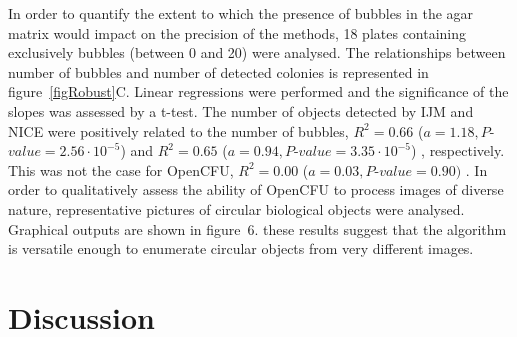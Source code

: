 \documentclass[10pt]{article}
\newcommand{\IJM}{IJM}
\newcommand{\BubbleNoiseOCFU}{$R^2 = 0.00$ ($a=0.03, P$-$value=0.90)$ }
\newcommand{\BubbleNoiseNICE}{$R^2 = 0.65$ ($a=0.94, P$-$value=3.35\cdot 10^{-5}$) }
\newcommand{\BubbleNoiseIJM}{$R^2 = 0.66$ ($a=1.18, P$-$value=2.56\cdot 10^{-5}$) }
\begin{document}
In order to quantify the extent to which the presence of bubbles in the agar matrix would impact on
the precision of the methods, 18 plates containing exclusively bubbles (between
0 and 20) were analysed. The relationships between number of bubbles and number
of detected colonies is represented in figure~\ref{figRobust}C. Linear
regressions were performed and the significance of the slopes was assessed by a
t-test. The number of objects detected by \IJM{} and NICE were positively
related to the number of bubbles, \BubbleNoiseIJM and \BubbleNoiseNICE,
respectively. This was not the case for OpenCFU, \BubbleNoiseOCFU.
In order to qualitatively assess the ability of OpenCFU to process images of diverse nature,
representative pictures of circular biological objects were analysed. 
Graphical outputs are shown 
in figure~6.
these results suggest
that the algorithm is versatile enough to 
enumerate circular objects from very different images.




\section*{Discussion}
\end{document}
